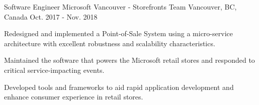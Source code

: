 \begin{cventries}
  \cventry
    {Software Engineer} %
    {Microsoft Vancouver - Storefronts Team} %
    {Vancouver, BC, Canada} %
    {Oct. 2017 - Nov. 2018} %
    {
      \begin{cvitems} %
	      \item {Redesigned and implemented a Point-of-Sale System using a micro-service architecture with excellent robustness and scalability characteristics.}
	      \item {Maintained the software that powers the Microsoft retail stores and responded to critical service-impacting events.}
	      \item {Developed tools and frameworks to aid rapid application development and enhance consumer experience in retail stores.}
        \\
      \end{cvitems}
    }

\iffalse
  \cventry
    {Software Engineering Co-Op} %
    {Microsoft Studios ``The Coalition''} %
    {Vancouver, BC, Canada} %
    {Jan. 2016 - Aug. 2016} %
    {
      \begin{cvitems} %
        \item {Created a custom, proprietary system for patching game content after release.}
        \item {Worked with senior engineers in resolving crashes and performing low-level optimizations.}
        \item {Developed tools to improve iteration and enable automatic analysis and verification.}
        \\
     	\technologies{C++, C\#, Python, AMD64 Assembly, Unreal Engine 4, Visual Studio, Microsoft XDK, Perforce.}
      \end{cvitems}
    }

  \cventry
    {Gameplay Programmer} %
    {Behaviour Interactive} %
    {Montréal, QC, Canada} %
    {Sep. 2014 - Dec. 2014} %
    {
      \begin{cvitems} %
        \item {Developed and improved features in gameplay, networking and graphics rendering.}
        \item {Worked closely with game designers on implementing new mechanics and customizations.}
        \item {Assisted in performing memory and processing optimizations to the game.}
        \\
        \technologies {C\#, CG, Unity, Unreal Engine 4, Visual Studio, Python, Nvidia Nsight.}
      \end{cvitems}
    }
\fi

\end{cventries}
